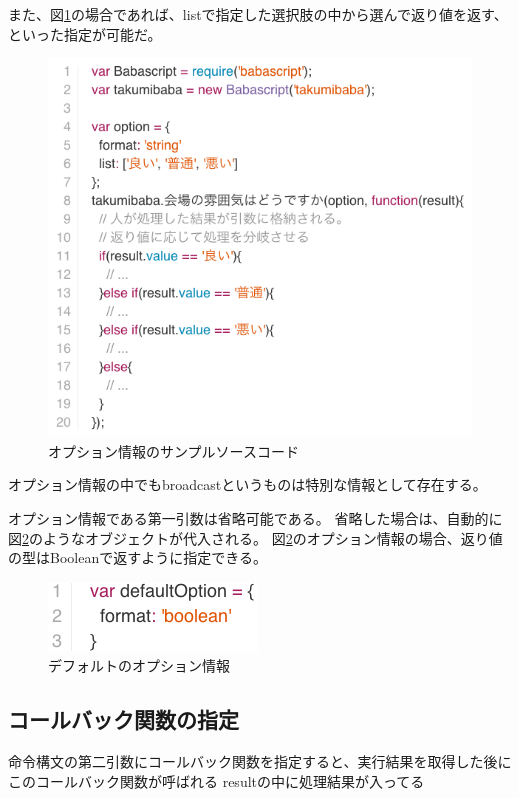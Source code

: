 また、図\ref{fig:babascript_option_list}の場合であれば、listで指定した選択肢の中から選んで返り値を返す、といった指定が可能だ。

\begin{figure}[htbp]
  \begin{center}
  \includegraphics[width=.5\linewidth,bb=0 0 574 513]{images/babascript_option_list.js.png}
  \end{center}
  \caption{オプション情報のサンプルソースコード}
  \label{fig:babascript_option_list}
\end{figure}

オプション情報の中でもbroadcastというものは特別な情報として存在する。

オプション情報である第一引数は省略可能である。
省略した場合は、自動的に図\ref{fig:option_default}のようなオブジェクトが代入される。
図\ref{fig:option_default}のオプション情報の場合、返り値の型はBooleanで返すように指定できる。

\begin{figure}[htbp]
  \begin{center}
  \includegraphics[width=.4\linewidth,bb=0 0 210 70]{images/option_default.js.png}
  \end{center}
  \caption{デフォルトのオプション情報}
  \label{fig:option_default}
\end{figure}

\subsection{コールバック関数の指定}\label{ux30b3ux30fcux30ebux30d0ux30c3ux30afux95a2ux6570ux306eux6307ux5b9a}

命令構文の第二引数にコールバック関数を指定すると、実行結果を取得した後にこのコールバック関数が呼ばれる
resultの中に処理結果が入ってる

